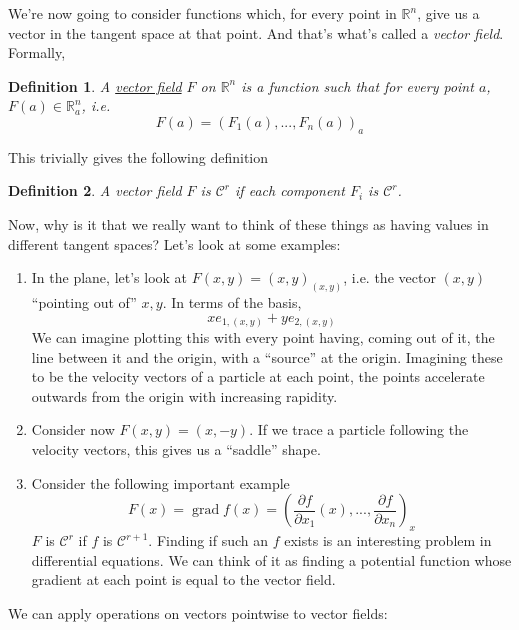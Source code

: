 \documentclass{article}
\newtheorem{definition}{Definition}
\DeclareMathOperator{\grad}{grad}
\newcommand{\reals}[0]{\mathbb{R}}
\newcommand{\mc}[1]{\mathcal{#1}}
\newcommand{\prt}[2]{\frac{\partial #1}{\partial #2}}
\begin{document}
We're now going to consider functions which, for every point in \(\reals^n\), give us a vector in the tangent space at that point. And that's what's called a \textit{vector field}. Formally,
\begin{definition}
  A \underline{vector field} \(F\) on \(\reals^n\) is a function such that for every point \(a\), \(F(a) \in \reals^n_a\), i.e.
  \begin{equation}
    F(a) = (F_1(a),...,F_n(a))_a
  \end{equation}
\end{definition}
This trivially gives the following definition
\begin{definition}
  A vector field \(F\) is \(\mc{C}^r\) if each component \(F_i\) is \(\mc{C}^r\).
\end{definition}
Now, why is it that we really want to think of these things as having values in different tangent spaces? Let's look at some examples:
\begin{enumerate}

  \item In the plane, let's look at \(F(x, y) = (x, y)_{(x, y)}\), i.e. the vector \((x, y)\) ``pointing out of'' \(x, y\). In terms of the basis,
  \begin{equation}
    xe_{1, (x, y)} + ye_{2, (x, y)}
  \end{equation}
  We can imagine plotting this with every point having, coming out of it, the line between it and the origin, with a ``source'' at the origin. Imagining these to be the velocity vectors of a particle at each point, the points accelerate outwards from the origin with increasing rapidity.

  \item Consider now \(F(x, y) = (x, -y)\). If we trace a particle following the velocity vectors, this gives us a ``saddle'' shape.

  \item Consider the following important example
  \begin{equation}
    F(x) = \grad f(x) = \left(\prt{f}{x_1}(x),...,\prt{f}{x_n}\right)_x
  \end{equation}
  \(F\) is \(\mc{C}^r\) if \(f\) is \(\mc{C}^{r + 1}\). Finding if such an \(f\) exists is an interesting problem in differential equations. We can think of it as finding a potential function whose gradient at each point is equal to the vector field.

\end{enumerate}
We can apply operations on vectors pointwise to vector fields:
\end{document}
